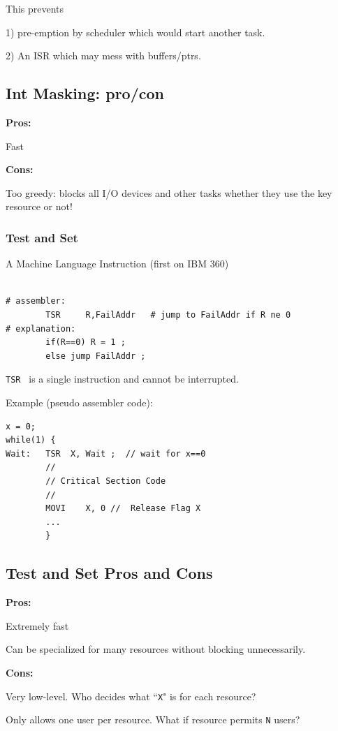 \documentclass{article}	%
\begin{document}
This prevents

1) pre-emption by scheduler which would
start another task.

2) An ISR which may mess with
buffers/ptrs.

\subsection*{Int Masking: pro/con}

\noindent
{\bf Pros:}

  Fast

\noindent
{\bf Cons:}

Too greedy:  blocks all I/O devices and other tasks whether
they use the key resource or not!


\subsubsection{Test and Set}

A Machine Language Instruction (first on IBM 360)

\begin{verbatim}

# assembler:
        TSR     R,FailAddr   # jump to FailAddr if R ne 0
# explanation:
        if(R==0) R = 1 ;
        else jump FailAddr ;
\end{verbatim}

{\tt TSR } is a single instruction and cannot be interrupted.

Example (pseudo assembler code):
\begin{verbatim}
x = 0;
while(1) {
Wait:   TSR  X, Wait ;  // wait for x==0
        //
        // Critical Section Code
        //
        MOVI    X, 0 //  Release Flag X
        ...
        }
\end{verbatim}


\subsection*{Test and Set Pros and Cons}

{\bf Pros:}

 Extremely fast

 Can be specialized for many resources without
 blocking unnecessarily.

{\bf Cons:}

  Very low-level.   Who decides what ``{\tt X}" is
  for each resource?

  Only allows one user per resource. What if resource
  permits {\tt N} users?
\end{document}
